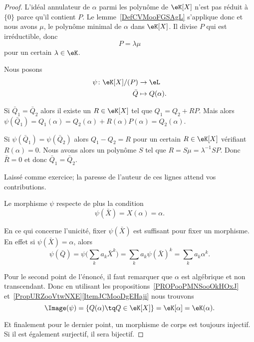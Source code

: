 \begin{proof}
	L'idéal annulateur de \( \alpha\) parmi les polynôme de \( \eK[X]\) n'est pas réduit à \( \{ 0 \}\) parce qu'il contient \( P\). Le lemme~\ref{DefCVMooFGSAgL} s'applique donc et nous avons \( \mu\), le polynôme minimal de \( \alpha\) dans \( \eK[X]\). Il divise \( P\) qui est irréductible, donc
	\begin{equation}
		P=\lambda \mu
	\end{equation}
	pour un certain \( \lambda\in \eK\).

	Nous posons
	\begin{equation}
		\begin{aligned}
			\psi\colon \eK[X]/(P) & \to \eL            \\
			\bar Q                & \mapsto Q(\alpha).
		\end{aligned}
	\end{equation}
	\begin{subproof}
		Si \( \bar Q_1=\bar Q_2\) alors il existe un \( R\in \eK[X]\) tel que \( Q_1=Q_2+RP\). Mais alors \( \psi(\bar Q_1)=Q_1(\alpha)=Q_2(\alpha)+R(\alpha)P(\alpha)=Q_2(\alpha)\).
		\spitem[Injective]

		Si \( \psi(\bar Q_1)=\psi(\bar Q_2)\) alors \( Q_1-Q_2=R\) pour un certain \( R\in \eK[X]\) vérifiant \( R(\alpha)=0\). Nous avons alors un polynôme \( S\) tel que \( R=S\mu=\lambda^{-1}SP\). Donc \( \bar R=0\) et donc \( \bar Q_1=\bar Q_2\).

		\spitem[Morphisme]

		Laissé comme exercice; la paresse de l'auteur de ces lignes attend vos contributions.

		\spitem[La condition]

		Le morphisme \( \psi\) respecte de plus la condition
		\begin{equation}
			\psi(\bar X)=X(\alpha)=\alpha.
		\end{equation}

	\end{subproof}

	En ce qui concerne l'unicité, fixer \( \psi(\bar X)\) est suffisant pour fixer un morphisme. En effet si \( \psi(\bar X)=\alpha\), alors
	\begin{equation}
		\psi(\bar Q)=\psi\Big( \sum_ka_k\bar X^k \Big)=\sum_ka_k\psi(\bar X)^k=\sum_ka_k\alpha^k.
	\end{equation}

	Pour le second point de l'énoncé, il faut remarquer que \( \alpha\) est algébrique et non transcendant. Donc en utilisant les propositions~\ref{PROPooPMNSooOkHOxJ} et~\ref{PropURZooVtwNXE}\ref{ItemJCMooDgEHaji} nous trouvons
	\begin{equation}
		\Image(\psi)=\{ Q(\alpha)\tq Q\in \eK[X] \}=\eK[\alpha]=\eK(\alpha).
	\end{equation}

	Et finalement pour le dernier point, un morphisme de corps est toujours injectif. Si il est également surjectif, il sera bijectif.
\end{proof}


